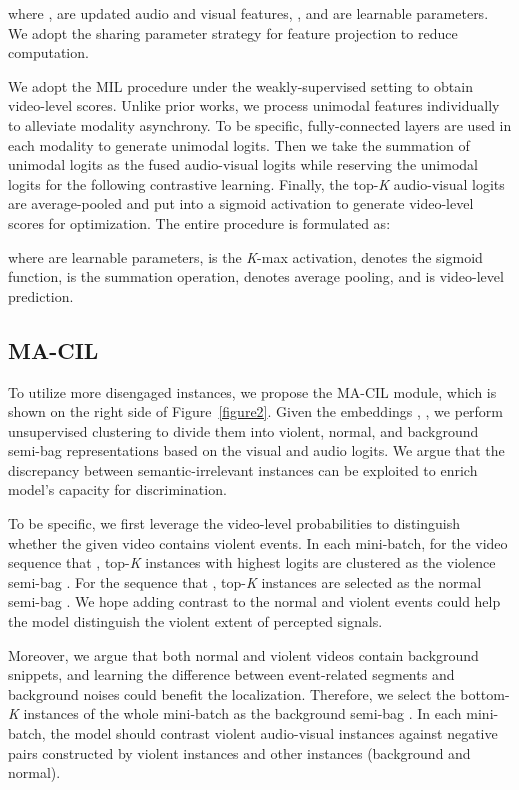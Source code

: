\documentclass[sigconf]{acmart}
\begin{document}
where ,  are updated audio and visual features, , and  are learnable parameters. We adopt the sharing parameter strategy for feature projection to reduce computation.

We adopt the MIL procedure under the weakly-supervised setting to obtain video-level scores. Unlike prior works, we process unimodal features individually to alleviate modality asynchrony. To be specific, fully-connected layers are used in each modality to generate unimodal logits. Then we take the summation of unimodal logits as the fused audio-visual logits while reserving the unimodal logits for the following contrastive learning. Finally, the top-\textit{K} audio-visual logits are average-pooled and put into a sigmoid activation to generate video-level scores for optimization. The entire procedure is formulated as:


where  are learnable parameters,  is the \textit{K}-max activation,  denotes the sigmoid function,  is the summation operation,  denotes average pooling, and  is video-level prediction.

\subsection{MA-CIL}

To utilize more disengaged instances, we propose the MA-CIL module, which is shown on the right side of Figure~\ref{figure2}. Given the embeddings , , we perform unsupervised clustering to divide them into violent, normal, and background semi-bag representations based on the visual and audio logits. We argue that the discrepancy between semantic-irrelevant instances can be exploited to enrich model's capacity for discrimination.

To be specific, we first leverage the video-level probabilities  to distinguish whether the given video contains violent events. In each mini-batch, for the video sequence  that , top-\textit{K} instances with highest logits are clustered as the violence semi-bag . For the sequence  that , top-\textit{K} instances are selected as the normal semi-bag . We hope adding contrast to the normal and violent events could help the model distinguish the violent extent of percepted signals.

Moreover, we argue that both normal and violent videos contain background snippets, and learning the difference between event-related segments and background noises could benefit the localization. Therefore, we select the bottom-\textit{K} instances of the whole mini-batch as the background semi-bag . In each mini-batch, the model should contrast violent audio-visual instances against negative pairs constructed by violent instances and other instances (background and normal).
\end{document}
